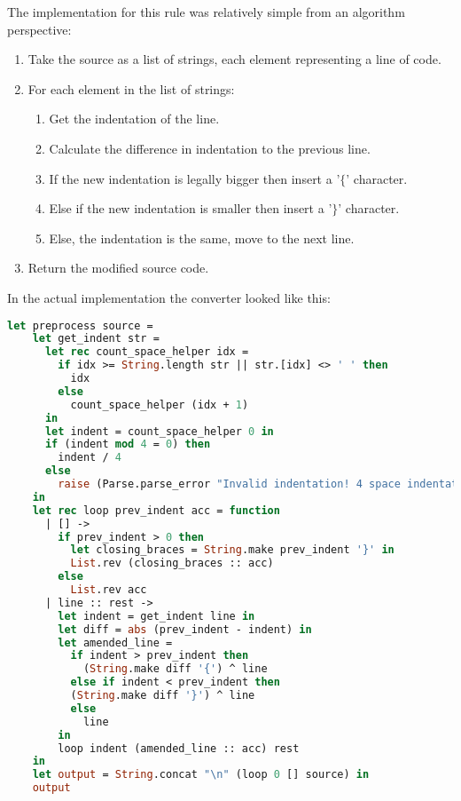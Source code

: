\documentclass{l4proj}
\begin{document}
The implementation for this rule was relatively simple from an algorithm perspective:

\begin{enumerate}
    \item Take the source as a list of strings, each element representing a line of code.
    \item For each element in the list of strings:
    \begin{enumerate}
        \item Get the indentation of the line.
        \item Calculate the difference in indentation to the previous line.
        \item If the new indentation is legally bigger then insert a '$\{$' character.
        \item Else if the new indentation is smaller then insert a '$\}$' character.
        \item Else, the indentation is the same, move to the next line.
    \end{enumerate}
    \item Return the modified source code.
\end{enumerate}

In the actual implementation the converter looked like this:

\begin{lstlisting}[language=Caml, caption=The 'preprocess' function that handles all whitespace scoping in PyFunc.]
let preprocess source =
    let get_indent str = 
      let rec count_space_helper idx = 
        if idx >= String.length str || str.[idx] <> ' ' then
          idx
        else
          count_space_helper (idx + 1)
      in
      let indent = count_space_helper 0 in
      if (indent mod 4 = 0) then
        indent / 4
      else
        raise (Parse.parse_error "Invalid indentation! 4 space indentation required.")
    in
    let rec loop prev_indent acc = function
      | [] -> 
        if prev_indent > 0 then
          let closing_braces = String.make prev_indent '}' in
          List.rev (closing_braces :: acc)
        else 
          List.rev acc
      | line :: rest ->
        let indent = get_indent line in
        let diff = abs (prev_indent - indent) in
        let amended_line =
          if indent > prev_indent then
            (String.make diff '{') ^ line
          else if indent < prev_indent then
          (String.make diff '}') ^ line
          else
            line
        in
        loop indent (amended_line :: acc) rest
    in
    let output = String.concat "\n" (loop 0 [] source) in
    output
\end{lstlisting}
\end{document}
